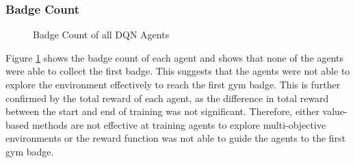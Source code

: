 \subsubsection{Badge Count}

\begin{figure}[H]
    \centering
    \caption{Badge Count of all DQN Agents}
    \label{fig:DQN_badge_count}
\end{figure}

Figure \ref{fig:DQN_badge_count} shows the badge count of each agent and shows that none of the agents were able to collect the first badge. This suggests that the agents were not able to explore the environment effectively to reach the first gym badge. This is further confirmed by the total reward of each agent, as the difference in total reward between the start and end of training was not significant. Therefore, either value-based methods are not effective at training agents to explore multi-objective environments or the reward function was not able to guide the agents to the first gym badge.

